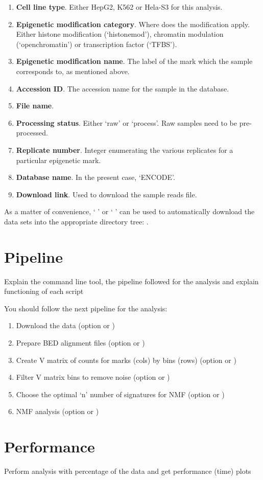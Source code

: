 \begin{enumerate}
    \item \textbf{Cell line type}. Either HepG2, K562 or Hela-S3 for this analysis.
    \item \textbf{Epigenetic modification category}. Where does the modification apply. Either histone modification (`histonemod'), chromatin modulation (`openchromatin') or transcription factor (`TFBS').
    \item \textbf{Epigenetic modification name}. The label of the mark which the sample corresponds to, as mentioned above.
    \item \textbf{Accession ID}. The accession name for the sample in the database.
    \item \textbf{File name}.
    \item \textbf{Processing status}. Either `raw' or `process'. Raw samples need to be pre-processed.
    \item \textbf{Replicate number}. Integer enumerating the various replicates for a particular epigenetic mark.
    \item \textbf{Database name}. In the present case, `ENCODE'.
    \item \textbf{Download link}. Used to download the sample reads file.
\end{enumerate}

As a matter of convenience, ` ' or `   ' can be used to automatically download the data sets into the appropriate directory tree: .


\section{Pipeline}

Explain the command line tool, the pipeline followed for the analysis and explain functioning of each script

You should follow the next pipeline for the analysis:

\begin{enumerate}
    \item Download the data (option  or )
    \item Prepare BED alignment files (option  or )
    \item Create V matrix of counts for marks (cols) by bins (rows) (option  or )
    \item Filter V matrix bins to remove noise (option  or )
    \item Choose the optimal `n' number of signatures for NMF (option  or )
    \item NMF analysis (option  or )
\end{enumerate}

\section{Performance}

Perform analysis with percentage of the data and get performance (time) plots
